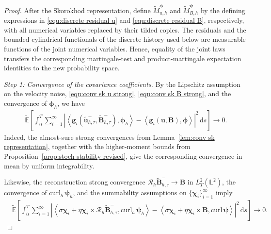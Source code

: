 \documentclass[11pt, reqno]{amsart}
\theoremstyle{definition}
\numberwithin{equation}{section}
\newcommand{\curl}{\mathrm{curl}\,}
\newcommand{\bff}{\boldsymbol}
\newcommand{\bb}{\mathbb}
\newcommand{\ds}{\,\mathrm{d}s}
\newcommand{\inpro}[2]{\left\langle#1,#2\right\rangle}
\newcommand{\abs}[1]{\left|{#1}\right|}
\newcommand{\curlh}{\mathrm{curl}_h\,}
\begin{document}
\begin{proof}
	After the Skorokhod representation, define
	$\widetilde M_{u,h}^{\bff\phi}$ and
	$\widetilde M_{B,h}^{\bff\psi}$ by the defining expressions in
	\eqref{equ:discrete residual u} and
	\eqref{equ:discrete residual B}, respectively, with all numerical
	variables replaced by their tilded copies. The residuals and the bounded
	cylindrical functionals of the discrete history used below are measurable
	functions of the joint numerical variables. Hence, equality of the joint
	laws transfers the corresponding martingale-test and product-martingale
	expectation identities to the new probability space.
	
	\emph{Step 1: Convergence of the covariance coefficients.}
	By the Lipschitz assumption on the velocity noise,
	\eqref{equ:conv sk u strong}, \eqref{equ:conv sk B strong}, and the
	convergence of $\bff\phi_h$, we have
	\begin{align}
		\label{equ:conv velocity martingale coefficients}
		\widetilde{\bb E} \left[
		\int_0^T
		\sum_{i=1}^{\infty}
		\abs{
			\inpro{
				\bff g_i(
				\widetilde{\bff u}_{h,\tau}^{-},
				\widetilde{\bff B}_{h,\tau}^{-})}
			{\bff\phi_h}
			-
			\inpro{\bff g_i(\bff u,\bff B)}{\bff\phi}
		}^2
		\ds \right]
		\longrightarrow0.
	\end{align}
	Indeed, the almost-sure strong convergences from
	Lemma~\ref{lem:conv sk representation}, together with the higher-moment bounds from Proposition~\ref{prop:stoch stability revised}, give the corresponding convergence in mean by uniform integrability.
	
	Likewise, the reconstruction strong convergence	$\mathcal R_h\widetilde{\bff B}_{h,\tau}^{-}
	\to\bff B$ in $L^2_T(\bb L^2)$,
	the convergence of $\curlh\bff\psi_h$, and the summability assumptions on
	$\{\bff\chi_i\}_{i=1}^{\infty}$ imply
	\begin{align}
		\label{equ:conv magnetic martingale coefficients}
		&\widetilde{\bb E} \left[
		\int_0^T
		\sum_{i=1}^{\infty}
		\abs{
			\inpro{
				\sigma\bff\chi_i
				+
				\eta\bff\chi_i\times
				\mathcal R_h\widetilde{\bff B}_{h,\tau}^{-}}
			{\curlh\bff\psi_h}
			-
			\inpro{
				\sigma\bff\chi_i+\eta\bff\chi_i\times\bff B}
			{\curl\bff\psi}
		}^2
		\ds \right]
		\longrightarrow0.
	\end{align}
	

\end{proof}
\end{document}
